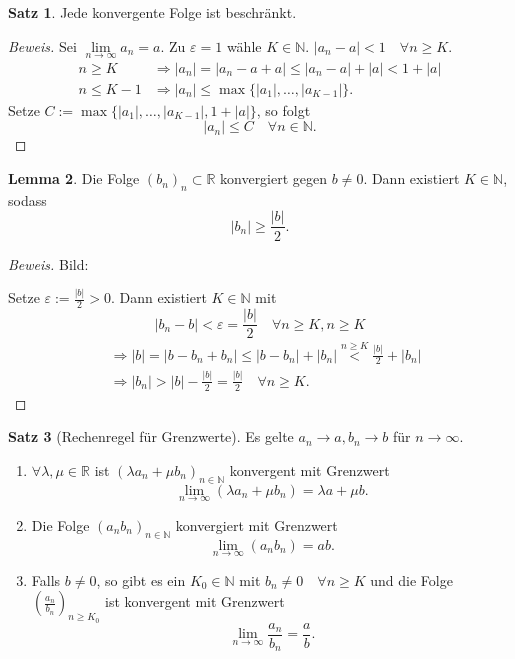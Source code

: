 \documentclass[12pt,a4paper,titlepage]{article} %
\theoremstyle{definition}
\newtheorem{satz}{Satz}[subsection]
\newtheorem{lem}[satz]{Lemma}
\theoremstyle{remark}
\newenvironment{bew}{\begin{proof}[Beweis]}{\end{proof}}
\newcommand{\N}{\mathbb{N}}
\newcommand{\R}{\mathbb{R}}
\newcommand{\limes}[1]{\lim\limits_{#1\rightarrow\infty}}
\begin{document}
\begin{satz}
	Jede konvergente Folge ist beschränkt.
\end{satz}
\begin{bew}
	Sei $\limes{n} a_n = a$. Zu $\varepsilon = 1$ wähle $K\in\N$.
	$|a_n-a|<1 \quad \forall n\geq K$.
	\begin{align*}
		n\geq K &\Rightarrow |a_n| = |a_n -a+a| \leq |a_n -a| + |a| < 1 + |a|\\
		n\leq K-1 &\Rightarrow |a_n| \leq \max\{|a_1|,\ldots,|a_{K-1}|\}.
	\end{align*}
	Setze $C:= \max\{|a_1|,\ldots,|a_{K-1}|, 1 + |a|\}$, so folgt
	$$|a_n| \leq C \quad\forall n\in\N.$$
\end{bew}
\begin{lem}
	Die Folge $(b_n)_n \subset \R$ konvergiert gegen $b\neq 0$. Dann existiert $K\in\N$, sodass 
	$$|b_n| \geq \frac{|b|}{2}.$$
\end{lem}
\begin{bew}
	Bild: \\
	\begin{center}
	\end{center}
	Setze $\varepsilon := \frac{|b|}{2}>0$. Dann existiert $K\in\N$ mit $$|b_n-b| < \varepsilon = \frac{|b|}{2} \quad\forall n\geq K, n\geq K$$
	\begin{align*}
		&\Rightarrow |b| = |b-b_n + b_n| \leq |b-b_n| + |b_n| \overset{n\geq K}{<} \frac{|b|}{2} + |b_n|\\
		&\Rightarrow |b_n| > |b| - \frac{|b|}{2} = \frac{|b|}{2} \quad \forall n\geq K.
	\end{align*}
\end{bew}
\begin{satz}[Rechenregel für Grenzwerte]
	Es gelte $a_n\rightarrow a, b_n \rightarrow b$ für $n\rightarrow\infty$.
	\begin{enumerate}
		\item $\forall \lambda, \mu \in\R$ ist $(\lambda a_n + \mu b_n)_{n\in\N}$ konvergent mit Grenzwert $$\limes{n} (\lambda a_n + \mu b_n) = \lambda a + \mu b.$$
		\item Die Folge $(a_nb_n)_{n\in\N}$ konvergiert mit Grenzwert $$\limes{n} (a_nb_n) = ab.$$
		\item Falls $b\neq 0$, so gibt es ein $K_0 \in\N$ mit $b_n \neq 0 \quad \forall n\geq K$ und die Folge $\left(\frac{a_n}{b_n}\right)_{n\geq K_0}$ ist konvergent mit Grenzwert $$\limes{n} \frac{a_n}{b_n} = \frac{a}{b}.$$
	\end{enumerate}
\end{satz}
\end{document}
